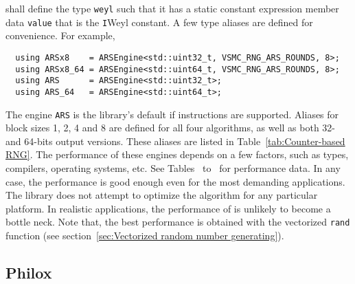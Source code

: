 shall define the type \verb|weyl| such that it has a static constant expression
member data \verb|value| that is the \verb|I|\ith Weyl constant. A few type
aliases are defined for convenience. For example,
\begin{Verbatim}
  using ARSx8    = ARSEngine<std::uint32_t, VSMC_RNG_ARS_ROUNDS, 8>;
  using ARSx8_64 = ARSEngine<std::uint64_t, VSMC_RNG_ARS_ROUNDS, 8>;
  using ARS      = ARSEngine<std::uint32_t>;
  using ARS_64   = ARSEngine<std::uint64_t>;
\end{Verbatim}
The engine \verb|ARS| is the library's default \rng if \aesni instructions are
supported. Aliases for block sizes 1, 2, 4 and 8 are defined for all four
algorithms, as well as both 32- and 64-bits output versions. These aliases are
listed in Table~\ref{tab:Counter-based RNG}. The performance of these engines
depends on a few factors, such as \cpu types, compilers, operating systems,
etc. See Tables~
to~ for performance data. In any case, the
performance is good enough even for the most demanding applications. The
library does not attempt to optimize the algorithm for any particular platform.
In realistic applications, the performance of \rng is unlikely to become a
bottle neck. Note that, the best performance is obtained with the vectorized
\verb|rand| function (see section~\ref{sec:Vectorized random number
  generating}).

\subsection{Philox}
\label{sub:Philox}

